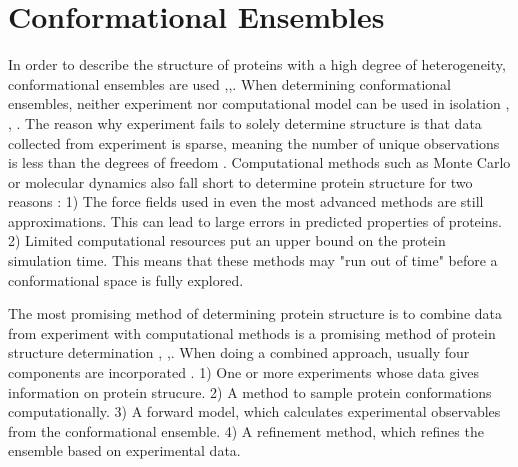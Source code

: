 \documentclass{article}
\begin{document}
\section{Conformational Ensembles}

In order to describe the structure of proteins with a high degree of heterogeneity, conformational ensembles are used \cite{lindorff-larsenSimultaneousDeterminationProtein2005},\cite{bonomiPrinciplesProteinStructural2017},\cite{thomasenConformationalEnsemblesIntrinsically2022}. 
When determining conformational ensembles, neither experiment nor computational model can be used in isolation  \cite{bonomiPrinciplesProteinStructural2017}, \cite{lindorff-larsenSimultaneousDeterminationProtein2005}, \cite{schneidman-duhovnyUncertaintyIntegrativeStructural2014}. 
The reason why experiment fails to solely determine structure is that data collected from experiment is sparse, meaning the number of unique observations is less than the degrees of freedom  \cite{schneidman-duhovnyUncertaintyIntegrativeStructural2014}. 
Computational methods such as Monte Carlo or molecular dynamics also fall short to determine protein structure for two reasons \cite{bonomiPrinciplesProteinStructural2017}:
1) The force fields used in even the most advanced methods are still approximations. This can lead to large errors in predicted properties of proteins.
2) Limited computational resources put an upper bound on the protein simulation time.
    This means that these methods may "run out of time" before a conformational space is fully explored.
 
The most promising method of determining protein structure is to combine data from experiment with computational methods is a promising method of protein structure determination \cite{bonomiPrinciplesProteinStructural2017} ,\cite{thomasenConformationalEnsemblesIntrinsically2022} ,\cite{lindorff-larsenSimultaneousDeterminationProtein2005}.
When doing a combined approach, usually four components are incorporated \cite{thomasenConformationalEnsemblesIntrinsically2022}.
1) One or more experiments whose data gives information on protein strucure.
2) A method to sample protein conformations computationally.
3) A forward model, which calculates experimental observables from the conformational ensemble.
4) A refinement method, which refines the ensemble based on experimental data.
\end{document}
